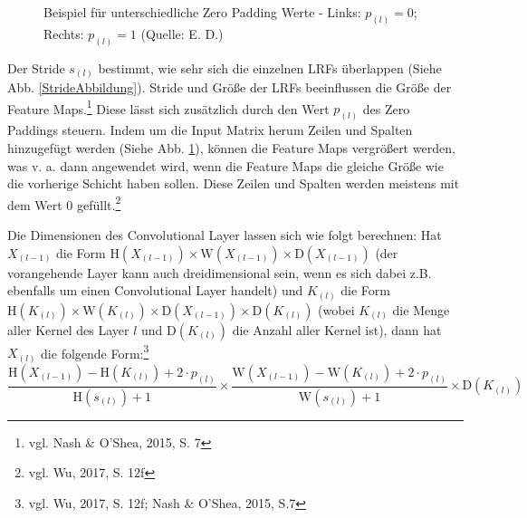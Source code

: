 \documentclass[
	a4paper,
	12pt,
	ngerman,
	oneside
]{scrreprt}											%
\newcommand{\cnnKlein}[1]{vgl. Nash \& O'Shea, 2015, S. {#1}}
\begin{document}
\begin{figure}[htb]
\begin{minipage}[t]{.3\linewidth}
						\caption{Beispiel für unterschiedliche Zero Padding Werte - Links: $p_{(l)}=0$; Rechts: $p_{(l)}=1$ (Quelle: E. D.)}\label{PaddingAbbildung}
						
					\end{minipage}
				\end{figure}
		
				\enlargethispage{0.2\baselineskip}
		
				Der Stride $s_{(l)}$ bestimmt, wie sehr sich die einzelnen LRFs überlappen (Siehe Abb. \ref{StrideAbbildung}). Stride und Größe der LRFs beeinflussen die Größe der Feature Maps.\footnote{\cnnKlein{7}} Diese lässt sich zusätzlich durch den Wert $p_{(l)}$ des Zero Paddings steuern. Indem um die Input Matrix herum Zeilen und Spalten hinzugefügt werden (Siehe Abb. \ref{PaddingAbbildung}), können die Feature Maps vergrößert werden, was v. a. dann angewendet wird, wenn die Feature Maps die gleiche Größe wie die vorherige Schicht haben sollen. Diese Zeilen und Spalten werden meistens mit dem Wert 0 gefüllt.\footnote{vgl. Wu, 2017, S. 12f}
		
				Die Dimensionen des Convolutional Layer lassen sich wie folgt berechnen: Hat $X_{(l-1)}$ die Form $\textrm{H}({X_{(l-1)}}) \times \textrm{W}({X_{(l-1)}}) \times \textrm{D}({X_{(l-1)}})$ (der vorangehende Layer kann auch dreidimensional sein, wenn es sich dabei z.B. ebenfalls um einen Convolutional Layer handelt) und $K_{(l)}$ die Form $\textrm{H}({K_{(l)}}) \times \textrm{W}({K_{(l)}}) \times \textrm{D}({X_{(l-1)}}) \times \textrm{D}({K_{(l)}})$ (wobei $K_{(l)}$ die Menge aller Kernel des Layer $l$ und $\textrm{D}({K_{(l)}})$ die Anzahl aller Kernel ist), dann hat $X_{(l)}$ die folgende Form:\footnote{vgl. Wu, 2017, S. 12f; Nash \& O'Shea, 2015, S.7}
				\begin{equation}
					\frac{ \textrm{H}(X_{(l-1)}) - \textrm{H}(K_{(l)}) + 2 \cdot p_{(l)}}{\textrm{H}(s_{(l)})+1} \times \frac{ \textrm{W}(X_{(l-1)}) - \textrm{W}(K_{(l)}) + 2 \cdot p_{(l)}}{\textrm{W}(s_{(l)})+1} \times \textrm{D}({K_{(l)}})
				\end{equation}
		
\end{document}
